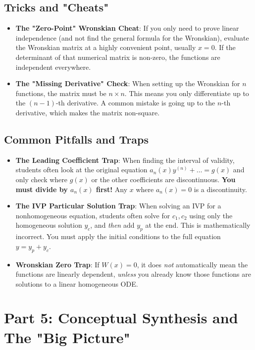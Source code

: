 \documentclass[11pt,letterpaper]{article}
\begin{document}
\subsection{Tricks and "Cheats"}
\begin{itemize}
    \item \textbf{The "Zero-Point" Wronskian Cheat}: If you only need to prove linear independence (and not find the general formula for the Wronskian), evaluate the Wronskian matrix at a highly convenient point, usually $x = 0$. If the determinant of that numerical matrix is non-zero, the functions are independent everywhere.
    \item \textbf{The "Missing Derivative" Check}: When setting up the Wronskian for $n$ functions, the matrix must be $n \times n$. This means you only differentiate up to the $(n-1)$-th derivative. A common mistake is going up to the $n$-th derivative, which makes the matrix non-square.
\end{itemize}

\subsection{Common Pitfalls and Traps}
\begin{itemize}
    \item \textbf{The Leading Coefficient Trap}: When finding the interval of validity, students often look at the original equation $a_n(x)y^{(n)} + \dots = g(x)$ and only check where $g(x)$ or the other coefficients are discontinuous. \textbf{You must divide by $a_n(x)$ first!} Any $x$ where $a_n(x) = 0$ is a discontinuity.
    \item \textbf{The IVP Particular Solution Trap}: When solving an IVP for a nonhomogeneous equation, students often solve for $c_1, c_2$ using only the homogeneous solution $y_c$, and \textit{then} add $y_p$ at the end. This is mathematically incorrect. You must apply the initial conditions to the full equation $y = y_p + y_c$.
    \item \textbf{Wronskian Zero Trap}: If $W(x) = 0$, it does \textit{not} automatically mean the functions are linearly dependent, \textit{unless} you already know those functions are solutions to a linear homogeneous ODE.
\end{itemize}

\newpage
\section{Part 5: Conceptual Synthesis and The "Big Picture"}
\end{document}
